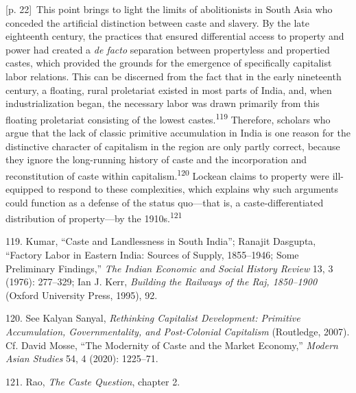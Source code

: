 \documentclass[10pt,a4paper]{article}
\begin{document}
{\scriptsize\color{gray} [p. 22]}\ This point brings to light the limits of abolitionists in South Asia who conceded the artificial distinction between caste and slavery. By the late eighteenth century, the practices that ensured differential access to property and power had created a \textit{de facto} separation between propertyless and propertied castes, which provided the grounds for the emergence of specifically capitalist labor relations. This can be discerned from the fact that in the early nineteenth century, a floating, rural proletariat existed in most parts of India, and, when industrialization began, the necessary labor was drawn primarily from this floating proletariat consisting of the lowest castes.\nobreak\textsuperscript{119} Therefore, scholars who argue that the lack of classic primitive accumulation in India is one reason for the distinctive character of capitalism in the region are only partly correct, because they ignore the long-running history of caste and the incorporation and reconstitution of caste within capitalism.\nobreak\textsuperscript{120} Lockean claims to property were ill-equipped to respond to these complexities, which explains why such arguments could function as a defense of the status quo—that is, a caste-differentiated distribution of property—by the 1910s.\nobreak\textsuperscript{121}\par{\small 119. Kumar, “Caste and Landlessness in South India”; Ranajit Dasgupta, “Factory Labor in Eastern India: Sources of Supply, 1855–1946; Some Preliminary Findings,” \textit{The Indian Economic and Social History Review} 13, 3 (1976): 277–329; Ian J. Kerr, \textit{Building the Railways of the Raj, 1850–1900} (Oxford University Press, 1995), 92.\par}{\small 120. See Kalyan Sanyal, \textit{Rethinking Capitalist Development: Primitive Accumulation, Governmentality, and Post-Colonial Capitalism} (Routledge, 2007). Cf. David Mosse, “The Modernity of Caste and the Market Economy,” \textit{Modern Asian Studies} 54, 4 (2020): 1225–71.\par}{\small 121. Rao, \textit{The Caste Question}, chapter 2.\par}
\end{document}
